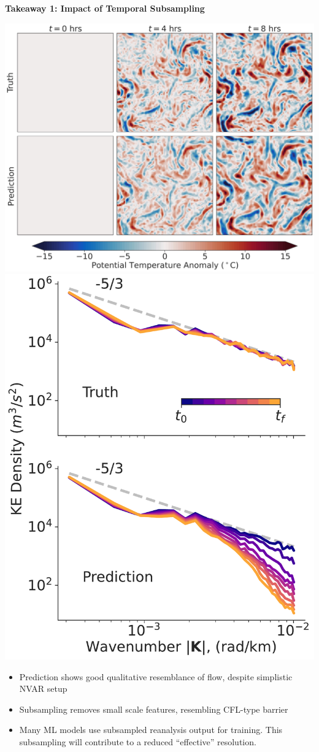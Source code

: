 
\begin{tcolorbox}[width=\textwidth,
    colframe=sapphire,
    colback=white,
    arc=24pt,
    boxrule=5pt,
    boxsep=0.5em]


    \begin{minipage}{\textwidth}
        \centering
        \textbf{Takeaway 1: Impact of Temporal Subsampling}
    \end{minipage}
    \vspace{1em}

    \begin{minipage}{\textwidth}
        \centering
        \includegraphics[width=.65\textwidth]{../../figures/nvar-diff-4800dt-nice.jpg}
        \includegraphics[width=.34\textwidth,trim={0, -2em, 0, 0}, clip]{
        ../../figures/spectrum_4800dt_nice.pdf}
    \end{minipage}

    \vspace{1.5em}
    \begin{minipage}{\textwidth}
        \begin{itemize}
            \item Prediction shows good qualitative resemblance of flow,
                despite simplistic NVAR setup
            \item Subsampling removes small scale features, resembling
                CFL-type barrier
            \item Many ML models use subsampled reanalysis output for
                training. This subsampling will contribute to a reduced
                ``effective'' resolution.
        \end{itemize}
    \end{minipage}
\end{tcolorbox}


